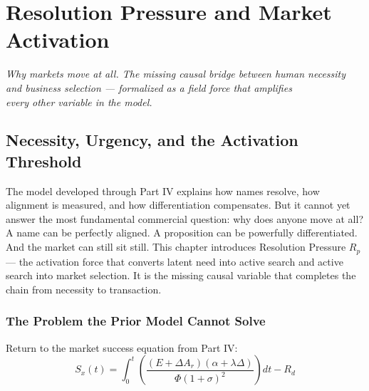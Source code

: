 \documentclass[12pt, openany]{book}
\theoremstyle{thmstyle}
\theoremstyle{defstyle}
\begin{document}
\tableofcontents
\newpage

\part{Resolution Pressure and Market Activation}

\vspace{16pt}
\begin{center}
\color{accentgray}\itshape
Why markets move at all. The missing causal bridge between human necessity\\
and business selection --- formalized as a field force that amplifies\\
every other variable in the model.
\end{center}

\chapter{Necessity, Urgency, and the Activation Threshold}

\begin{keybox}
The model developed through Part IV explains how names resolve, how alignment is measured, and how differentiation compensates. But it cannot yet answer the most fundamental commercial question: why does anyone move at all? A name can be perfectly aligned. A proposition can be powerfully differentiated. And the market can still sit still. This chapter introduces Resolution Pressure $R_p$ --- the activation force that converts latent need into active search and active search into market selection. It is the missing causal variable that completes the chain from necessity to transaction.
\end{keybox}

\section{The Problem the Prior Model Cannot Solve}

Return to the market success equation from Part IV:
\[
S_x(t) = \int_0^t \left(\frac{(E + \Delta A_r)(\alpha + \lambda\Delta)}{\Phi(1+\sigma)^2}\right) dt - R_d
\]
\end{document}
